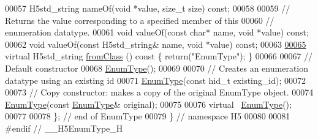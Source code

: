 \begin{DoxyCode}
00057         H5std\_string nameOf(\textcolor{keywordtype}{void} *value, \textcolor{keywordtype}{size\_t} size) \textcolor{keyword}{const};
00058 
00059         \textcolor{comment}{// Returns the value corresponding to a specified member of this}
00060         \textcolor{comment}{// enumeration datatype.}
00061         \textcolor{keywordtype}{void} valueOf(\textcolor{keyword}{const} \textcolor{keywordtype}{char}* name, \textcolor{keywordtype}{void} *value) \textcolor{keyword}{const};
00062         \textcolor{keywordtype}{void} valueOf(\textcolor{keyword}{const} H5std\_string& name, \textcolor{keywordtype}{void} *value) \textcolor{keyword}{const};
00063 
\hyperlink{class_h5_1_1_enum_type_aeef68c3a71fb4d3516985007fb3410fd}{00065}         \textcolor{keyword}{virtual} H5std\_string \hyperlink{class_h5_1_1_enum_type_aeef68c3a71fb4d3516985007fb3410fd}{fromClass} ()\textcolor{keyword}{ const }\{ \textcolor{keywordflow}{return}(\textcolor{stringliteral}{"EnumType"}); \}
00066 
00067         \textcolor{comment}{// Default constructor}
00068         \hyperlink{class_h5_1_1_enum_type}{EnumType}();
00069 
00070         \textcolor{comment}{// Creates an enumeration datatype using an existing id}
00071         \hyperlink{class_h5_1_1_enum_type}{EnumType}(\textcolor{keyword}{const} hid\_t existing\_id);
00072 
00073         \textcolor{comment}{// Copy constructor: makes a copy of the original EnumType object.}
00074         \hyperlink{class_h5_1_1_enum_type}{EnumType}(\textcolor{keyword}{const} \hyperlink{class_h5_1_1_enum_type}{EnumType}& original);
00075 
00076         \textcolor{keyword}{virtual} ~\hyperlink{class_h5_1_1_enum_type}{EnumType}();
00077 
00078 \}; \textcolor{comment}{// end of EnumType}
00079 \} \textcolor{comment}{// namespace H5}
00080 
00081 \textcolor{preprocessor}{#endif // \_\_H5EnumType\_H}
\end{DoxyCode}

